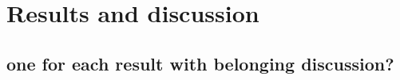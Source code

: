 \chapter{Results and discussion}
\label{chap:results}
\section{one for each result with belonging discussion?}